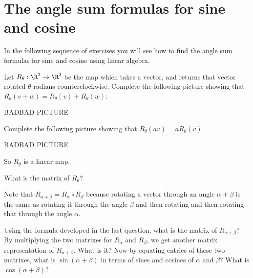 
\section{The angle sum formulas for sine and cosine}

In the following sequence of exercises you will see how to find the angle sum formulas for sine and cosine using linear algebra.


\begin{question}
	Let $R_\theta : \R^2 \to \R^2$ be the map which takes a vector, and returns that vector rotated $\theta$ radians counterclockwise.
	Complete the following picture showing that $R_\theta(v+w) = R_\theta(v)+R_\theta(w)$:
	
	BADBAD PICTURE
	
	Complete the following picture showing that $R_\theta(av) = aR_\theta(v)$
	
	BADBAD PICTURE
\end{question}

	So $R_\theta$ is a linear map.
	
	\begin{question}
		What is the matrix of $R_\theta$?
	\end{question}
	
	Note that $R_{\alpha+\beta} = R_{\alpha} \circ R_{\beta}$ because rotating a vector through an angle $\alpha +\beta$
	 is the same as rotating it through the angle $\beta$ and then rotating and then rotating that through the angle $\alpha$.
	 
	 \begin{question}
	 	Using the formula developed in the last question, what is the matrix of $R_{\alpha+\beta}$?
	 	By multiplying the two matrixes for $R_\alpha$ and $R_\beta$, we get another matrix representation of $R_{\alpha +\beta}$.  What is it?
	 	Now by equating entries of these two matrixes, what is $\sin(\alpha+\beta)$ in terms of sines and cosines of $\alpha$ and $\beta$?
	 	What is $\cos(\alpha+\beta)$?
	 \end{question}
